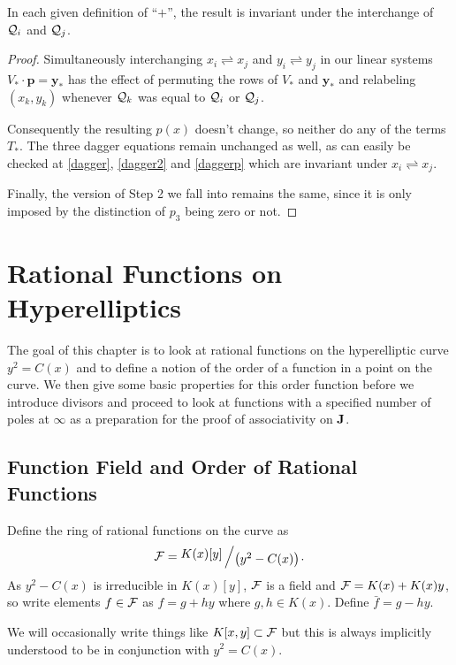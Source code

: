 \documentclass[english,11pt,a4paper]{article}
\begin{document}
\begin{lemma}
In each given definition of ``$+$'', the result is invariant under the interchange of $\mathcal{Q}_i$ and $\mathcal{Q}_j$.

\begin{proof}
  Simultaneously interchanging $x_i \rightleftharpoons x_j$ and $y_i \rightleftharpoons y_j$ in our linear systems $V_{\ast} \cdot \mathbf{p} = \mathbf{y}_{\ast}$ has the effect of permuting the rows of $V_{\ast}$ and $\mathbf{y}_{\ast}$ and relabeling $(x_k,y_k)$ whenever $\mathcal{Q}_k$ was equal to $\mathcal{Q}_i$ or $\mathcal{Q}_j$.

  Consequently the resulting $p(x)$ doesn't change, so neither do any of the terms $T_{\ast}$. The three dagger equations remain unchanged as well, as can easily be checked at \eqref{dagger}, \eqref{dagger2} and \eqref{daggerp} which are invariant under $x_i \rightleftharpoons x_j$.

  Finally, the version of Step 2 we fall into remains the same, since it is only imposed by the distinction of $p_3$ being zero or not.
\end{proof}
\end{lemma}


\newpage

\section{Rational Functions on Hyperelliptics}

The goal of this chapter is to look at rational functions on the hyperelliptic curve $y^2 = C(x)$ and to define a notion of the order of a function in a point on the curve. We then give some basic properties for this order function before we introduce divisors and proceed to look at functions with a specified number of poles at $\infty$ as a preparation for the proof of associativity on $\mathbf{J}$.

\subsection{Function Field and Order of Rational Functions}

\begin{defin}
  Define the ring of rational functions on the curve as
  \begin{align*}
    \F = \bigslant{K(x)[y]}{\big(y^2-C(x)\big)}.
  \end{align*}
  As $y^2-C(x)$ is irreducible in $K(x)[y]$, $\mathcal{F}$ is a field
  and $\mathcal{F} = K(x) + K(x) y$, so write elements $f \in \mathcal{F}$ as $f = g + hy$ where $g,h \in K(x)$. Define $\bar f = g - hy$.

  We will occasionally write things like $K[x,y] \subset \mathcal{F}$ but this is always implicitly understood to be in conjunction with $y^2=C(x)$.
\end{defin}
\end{document}

